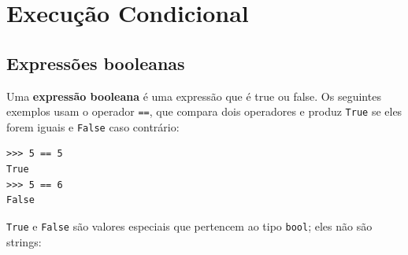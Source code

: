 
\chapter{Execução Condicional}

\section{Expressões booleanas}





Uma {\bf expressão booleana} é uma expressão que é true 
ou false.  Os seguintes exemplos usam o 
operador {\tt ==}, que compara dois operadores e produz
{\tt True} se eles forem iguais e {\tt False} caso contrário:


\beforeverb
\begin{verbatim}
>>> 5 == 5
True
>>> 5 == 6
False
\end{verbatim}
\afterverb
%

{\tt True} e {\tt False} são valores
especiais que pertencem ao tipo {\tt bool}; eles não são strings:



